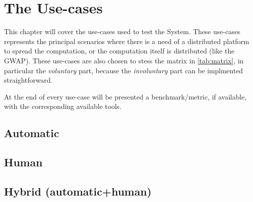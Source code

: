 
\chapter{The Use-cases}
\label{cap:cases}





This chapter will cover the use-cases used to test the System. These use-cases
represents the principal scenarios where there is a need of a distributed
platform to spread the computation, or the computation itself is distributed
(like the \ac{GWAP}). These use-cases are also chosen to stess the matrix in
\autoref{tab:matrix}, in particular the \emph{voluntary} part, because the
\emph{involuntary} part can be implmented straightforward.

At the end of every use-case will be presented a benchmark/metric, if available,
with the corresponding available tools.



\section{Automatic}
\label{sec:cases:automatic}


\section{Human}
\label{sec:cases:human}



\section{Hybrid (automatic+human)}
\label{sec:cases:hybrid}
